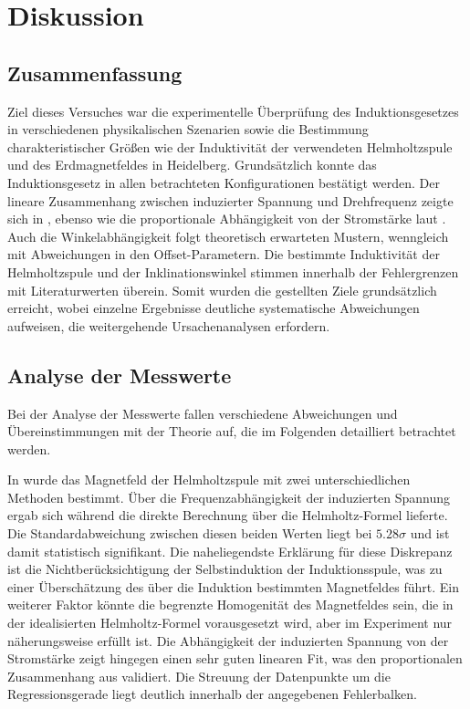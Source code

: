 \chapter{Diskussion}
\label{ch:Diskussion}

\section{Zusammenfassung}
\label{sec:Zusammenfassung}
Ziel dieses Versuches war die experimentelle Überprüfung des Induktionsgesetzes in verschiedenen physikalischen Szenarien sowie die Bestimmung charakteristischer Größen wie der Induktivität der verwendeten Helmholtzspule und des Erdmagnetfeldes in Heidelberg. Grundsätzlich konnte das Induktionsgesetz in allen betrachteten Konfigurationen bestätigt werden. Der lineare Zusammenhang zwischen induzierter Spannung und Drehfrequenz zeigte sich in , ebenso wie die proportionale Abhängigkeit von der Stromstärke laut . Auch die Winkelabhängigkeit folgt theoretisch erwarteten Mustern, wenngleich mit Abweichungen in den Offset-Parametern. Die bestimmte Induktivität der Helmholtzspule und der Inklinationswinkel stimmen innerhalb der Fehlergrenzen mit Literaturwerten überein. Somit wurden die gestellten Ziele grundsätzlich erreicht, wobei einzelne Ergebnisse deutliche systematische Abweichungen aufweisen, die weitergehende Ursachenanalysen erfordern.

\section{Analyse der Messwerte}
\label{sec:Analyse}
Bei der Analyse der Messwerte fallen verschiedene Abweichungen und Übereinstimmungen mit der Theorie auf, die im Folgenden detailliert betrachtet werden.

In  wurde das Magnetfeld der Helmholtzspule mit zwei unterschiedlichen Methoden bestimmt. Über die Frequenzabhängigkeit der induzierten Spannung ergab sich 
während die direkte Berechnung über die Helmholtz-Formel 
lieferte. Die Standardabweichung zwischen diesen beiden Werten liegt bei 
$5.28\sigma$ und ist damit statistisch signifikant. Die naheliegendste Erklärung für diese Diskrepanz ist die Nichtberücksichtigung der Selbstinduktion der Induktionsspule, was zu einer Überschätzung des über die Induktion bestimmten Magnetfeldes führt. Ein weiterer Faktor könnte die begrenzte Homogenität des Magnetfeldes sein, die in der idealisierten Helmholtz-Formel vorausgesetzt wird, aber im Experiment nur näherungsweise erfüllt ist.
Die Abhängigkeit der induzierten Spannung von der Stromstärke zeigt hingegen einen sehr guten linearen Fit, was den proportionalen Zusammenhang aus  validiert. Die Streuung der Datenpunkte um die Regressionsgerade liegt deutlich innerhalb der angegebenen Fehlerbalken.

